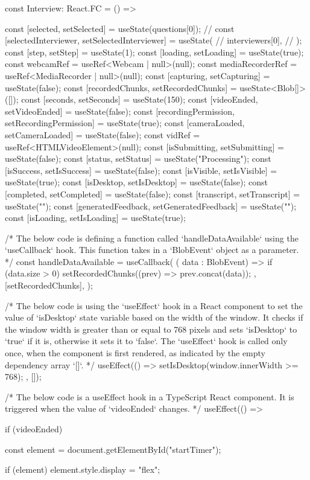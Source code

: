 const Interview: React.FC = () => {
  const [selected, setSelected] = useState(questions[0]);
  // const [selectedInterviewer, setSelectedInterviewer] = useState(
  //   interviewers[0],
  // );
  const [step, setStep] = useState(1);
  const [loading, setLoading] = useState(true);
  const webcamRef = useRef<Webcam | null>(null);
  const mediaRecorderRef = useRef<MediaRecorder | null>(null);
  const [capturing, setCapturing] = useState(false);
  const [recordedChunks, setRecordedChunks] = useState<Blob[]>([]);
  const [seconds, setSeconds] = useState(150);
  const [videoEnded, setVideoEnded] = useState(false);
  const [recordingPermission, setRecordingPermission] = useState(true);
  const [cameraLoaded, setCameraLoaded] = useState(false);
  const vidRef = useRef<HTMLVideoElement>(null);
  const [isSubmitting, setSubmitting] = useState(false);
  const [status, setStatus] = useState("Processing");
  const [isSuccess, setIsSuccess] = useState(false);
  const [isVisible, setIsVisible] = useState(true);
  const [isDesktop, setIsDesktop] = useState(false);
  const [completed, setCompleted] = useState(false);
  const [transcript, setTranscript] = useState("");
  const [generatedFeedback, setGeneratedFeedback] = useState("");
  const [isLoading, setIsLoading] = useState(true);

  /* The below code is defining a function called `handleDataAvailable` using the `useCallback` hook.
This function takes in a `BlobEvent` object as a parameter. */
  const handleDataAvailable = useCallback(
    ({ data }: BlobEvent) => {
      if (data.size > 0) {
        setRecordedChunks((prev) => prev.concat(data));
      }
    },
    [setRecordedChunks],
  );

  /* The below code is using the `useEffect` hook in a React component to set the value of `isDesktop`
state variable based on the width of the window. It checks if the window width is greater than or
equal to 768 pixels and sets `isDesktop` to `true` if it is, otherwise it sets it to `false`. The
`useEffect` hook is called only once, when the component is first rendered, as indicated by the
empty dependency array `[]`. */
  useEffect(() => {
    setIsDesktop(window.innerWidth >= 768);
  }, []);

  /* The below code is a useEffect hook in a TypeScript React component. It is triggered when the value
of `videoEnded` changes. */
  useEffect(() => {
    if (videoEnded) {
      const element = document.getElementById("startTimer");

      if (element) {
        element.style.display = "flex";
      }

}}}
